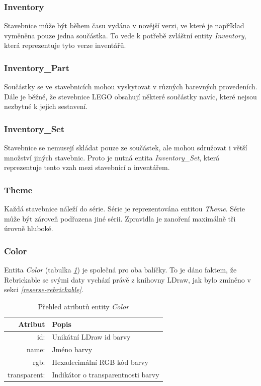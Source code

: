 \subsubsection*{Inventory}
Stavebnice může být během času vydána v novější verzi, ve které je například vyměněna pouze jedna součástka. To vede k potřebě zvláštní entity \textit{Inventory}, která reprezentuje tyto verze inventářů. 

\subsubsection*{Inventory\_Part} 
Součástky se ve stavebnicích mohou vyskytovat v různých barevných provedeních. Dále je běžné, že stevebnice LEGO obsahují některé součástky navíc, které nejsou nezbytné k jejich sestavení.

\subsubsection*{Inventory\_Set}
Stavebnice se nemusejí skládat pouze ze součástek, ale mohou sdružovat i větší množství jiných stavebnic. Proto je nutná entita \textit{Inventory\_Set}, která reprezentuje tento vzah mezi stavebnicí a inventářem.

\subsubsection*{Theme}
Každá stavebnice náleží do série. Série je reprezentována entitou \textit{Theme}. Série může být zároveň podřazena jiné sérii. Zpravidla je zanoření maximálně tři úrovně hluboké.

\subsubsection*{Color} 
Entita \textit{Color} (tabulka \emph{\ref{table:entity:color}}) je společná pro oba balíčky. To je dáno faktem, že Rebrickable se svými daty vychází právě z knihovny LDraw, jak bylo zmíněno v sekci \emph{\ref{reserse-rebrickable}}.

\begin{table}[th!]
  \centering
  \caption{Přehled atributů entity \textit{Color}}
  \label{table:entity:color}
  \begin{tabularx}{\textwidth}{@{}rX@{}}
  \toprule
  Atribut & Popis
  \\ \midrule
  id: & Unikátní LDraw id barvy \autocite{ldraw:colors}
  \\
  name: & Jméno barvy
  \\
  rgb: & Hexadecimální \gls{RGB} kód barvy 
  \\
  transparent: & Indikátor o transparentnosti barvy
  \\
  \bottomrule
  \end{tabularx}
\end{table}

